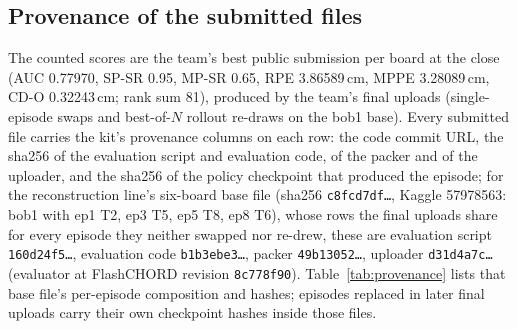 \documentclass[10pt]{nvidiaextabstract}
\begin{document}
\subsection{Provenance of the submitted files}
\label{app:provenance}
The counted scores are the team's best public submission per board at the close (AUC 0.77970, SP-SR 0.95, MP-SR 0.65, RPE 3.86589\,cm, MPPE 3.28089\,cm, CD-O 0.32243\,cm; rank sum 81), produced by the team's final uploads (single-episode swaps and best-of-$N$ rollout re-draws on the bob1 base). Every submitted file carries the kit's provenance columns on each row: the code commit URL, the sha256 of the evaluation script and evaluation code, of the packer and of the uploader, and the sha256 of the policy checkpoint that produced the episode; for the reconstruction line's six-board base file (sha256 \texttt{c8fcd7df\ldots}, Kaggle 57978563: bob1 with ep1 T2, ep3 T5, ep5 T8, ep8 T6), whose rows the final uploads share for every episode they neither swapped nor re-drew, these are evaluation script \texttt{160d24f5\ldots}, evaluation code \texttt{b1b3ebe3\ldots}, packer \texttt{49b13052\ldots}, uploader \texttt{d31d4a7c\ldots} (evaluator at FlashCHORD revision \texttt{8c778f90}). Table~\ref{tab:provenance} lists that base file's per-episode composition and hashes; episodes replaced in later final uploads carry their own checkpoint hashes inside those files.
\end{document}
